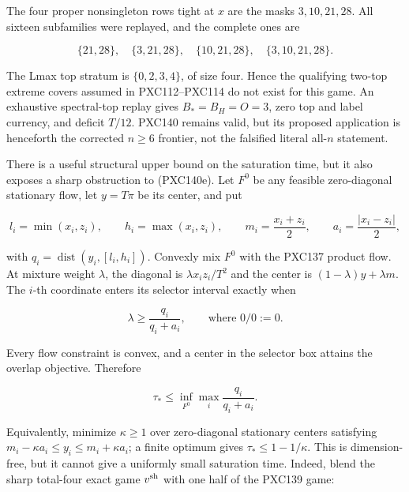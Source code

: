 \documentclass[11pt]{article}
\begin{document}
The four proper nonsingleton rows tight at $x$ are the masks
$3,10,21,28$.  All sixteen subfamilies were replayed, and the complete
ones are

\begin{equation}
 \{21,28\},\quad \{3,21,28\},\quad
 \{10,21,28\},\quad \{3,10,21,28\}.                  \tag{PXC141b}
\end{equation}

The Lmax top stratum is $\{0,2,3,4\}$, of size four.  Hence the qualifying
two-top extreme covers assumed in PXC112--PXC114 do not exist for this game.
An exhaustive spectral-top replay gives $B_*=B_H=O=3$, zero top and label
currency, and deficit $T/12$.  PXC140 remains valid, but its proposed
application is henceforth the corrected $n\ge6$ frontier, not the
falsified literal all-$n$ statement.

There is a useful structural upper bound on the saturation time, but it also
exposes a sharp obstruction to (PXC140e).  Let \(F^0\) be any feasible
zero-diagonal stationary flow, let \(y=T\pi\) be its center, and put

\[
 l_i=\min(x_i,z_i),\qquad h_i=\max(x_i,z_i),\qquad
 m_i=\frac{x_i+z_i}{2},\qquad a_i=\frac{|x_i-z_i|}{2},
\]

with \(q_i=\operatorname{dist}(y_i,[l_i,h_i])\).  Convexly mix \(F^0\)
with the PXC137 product flow.  At mixture weight \(\lambda\), the diagonal is
\(\lambda x_iz_i/T^2\) and the center is
\((1-\lambda)y+\lambda m\).  The \(i\)-th coordinate enters its selector
interval exactly when

\begin{equation}
 \lambda\ge\frac{q_i}{q_i+a_i},
 \qquad\text{where }0/0:=0.
 \tag{PXC142a}
\end{equation}

Every flow constraint is convex, and a center in the selector box attains
the overlap objective.  Therefore

\begin{equation}
 \boxed{\quad\tau_*
 \le \inf_{F^0}\max_i\frac{q_i}{q_i+a_i}.\quad}       \tag{PXC142b}
\end{equation}

Equivalently, minimize \(\kappa\ge1\) over zero-diagonal stationary centers
satisfying \(m_i-\kappa a_i\le y_i\le m_i+\kappa a_i\); a finite optimum
gives \(\tau_*\le1-1/\kappa\).  This is dimension-free, but it cannot give a
uniformly small saturation time.  Indeed, blend the sharp total-four exact
game \(v^{\rm sh}\) with one half of the PXC139 game:
\end{document}
